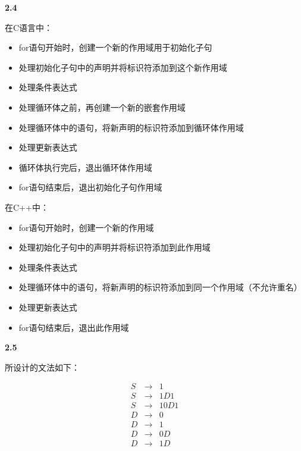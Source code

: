 \documentclass[UTF8]{report}
\newcommand{\tbf}[1]{\textbf{#1}}
\begin{document}
\noindent
\tbf{2.4}

在C语言中：

\begin{itemize}
  \item for语句开始时，创建一个新的作用域用于初始化子句
  \item 处理初始化子句中的声明并将标识符添加到这个新作用域
  \item 处理条件表达式
  \item 处理循环体之前，再创建一个新的嵌套作用域
  \item 处理循环体中的语句，将新声明的标识符添加到循环体作用域
  \item 处理更新表达式
  \item 循环体执行完后，退出循环体作用域
  \item for语句结束后，退出初始化子句作用域
\end{itemize}

在C++中：

\begin{itemize}
  \item for语句开始时，创建一个新的作用域
  \item 处理初始化子句中的声明并将标识符添加到此作用域
  \item 处理条件表达式
  \item 处理循环体中的语句，将新声明的标识符添加到同一个作用域（不允许重名）
  \item 处理更新表达式
  \item for语句结束后，退出此作用域
\end{itemize}

\noindent
\tbf{2.5}

所设计的文法如下：

\[
  \begin{array}{rcl}
    S & \to & 1 \\
    S & \to & 1D1 \\
    S & \to & 10D1 \\
    D & \to & 0 \\
    D & \to & 1 \\
    D & \to & 0D \\
    D & \to & 1D
  \end{array}
\]
\end{document}

